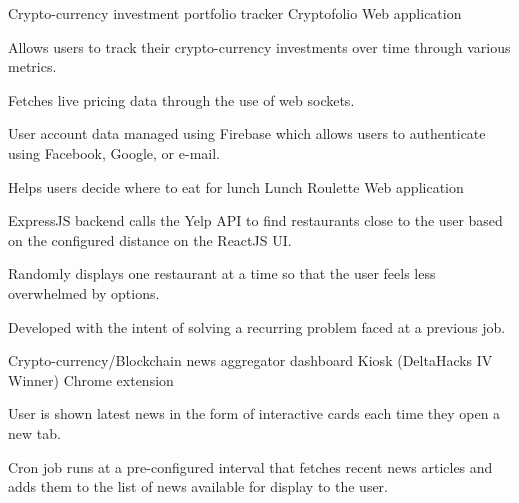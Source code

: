 


\begin{cventries}


\cventry
{Crypto-currency investment portfolio tracker} %
{Cryptofolio \href{https://github.com/kdelalic/Cryptofolio}{\faGithub}} %
{Web application}
{}
{ %
\begin{cvitems}
\item {Allows users to track their crypto-currency investments over time through various metrics.}
\item {Fetches live pricing data through the use of web sockets.}
\item {User account data managed using Firebase which allows users to authenticate using Facebook, Google, or e-mail.}
\end{cvitems}
}


\cventry
{Helps users decide where to eat for lunch} %
{Lunch Roulette \href{https://github.com/kdelalic/lunch-roulette}{\faGithub}} %
{Web application}
{}
{ %
\begin{cvitems}
\item {ExpressJS backend calls the Yelp API to find restaurants close to the user based on the configured distance on the ReactJS UI.}
\item {Randomly displays one restaurant at a time so that the user feels less overwhelmed by options.}
\item {Developed with the intent of solving a recurring problem faced at a previous job.}
\end{cvitems}
}


\cventry
{Crypto-currency/Blockchain news aggregator dashboard} %
{Kiosk (DeltaHacks IV Winner) \href{https://github.com/kdelalic/kiosk}{\faGithub}} %
{Chrome extension}
{}
{ %
\begin{cvitems}
\item {User is shown latest news in the form of interactive cards each time they open a new tab.}
\item {Cron job runs at a pre-configured interval that fetches recent news articles and adds them to the list of news available for display to the user.}
\end{cvitems}
}


\end{cventries}

